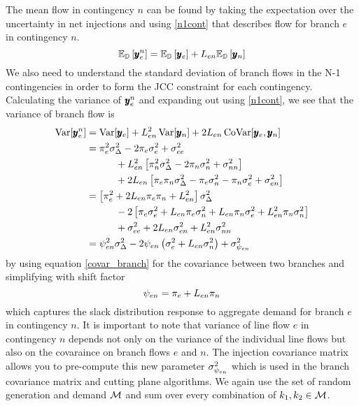 The mean flow in contingency $n$ can be found by taking the expectation over the uncertainty in net injections and using \cref{n1cont} that describes flow for branch $e$ in contingency $n$.
\begin{equation}
\mathbb{E}_{\mathbb{D}} \left[ \pmb{y}_e^n \right] =  \mathbb{E}_{\mathbb{D}} \left[ \pmb{y}_e \right]  + L_{en} \mathbb{E}_{\mathbb{D}} \left[ \pmb{y}_n \right] 
\end{equation}
We also need to understand the standard deviation of branch flows in the N-1 contingencies in order to form the JCC constraint for each contingency.  Calculating the variance of $\pmb{y}_e^n$ and expanding out using \cref{n1cont}, we see that the variance of branch flow is
\begin{subequations}
\begin{align}
 \operatorname{Var}[\pmb{y}_e^n] &= \operatorname{Var}[\pmb{y}_e] + L^2_{e n} \operatorname{Var}[ \pmb{y}_n ] + 2 L_{e n} \operatorname{CoVar}[ \pmb{y}_e, \pmb{y}_n ] \\
 &= \pi_e^2 \sigma_\Delta^2 - 2 \pi_e \sigma_e^2 + \sigma_{ee}^2 \nonumber \\
 &\hspace{30pt} + L_{en}^2 \left[ \pi_n^2 \sigma_\Delta^2 - 2 \pi_n \sigma_n^2 + \sigma_{nn}^2 \right] \nonumber \\
 &\hspace{30pt}+ 2 L_{en} \left[ \pi_{e} \pi_{n} \sigma_\Delta^2 -  \pi_{e} \sigma_{n}^2 - \pi_{n} \sigma_{e}^2   + \sigma_{e n}^2 \right]  \\
 &= \left[ \pi_e^2 + 2 L_{en} \pi_e \pi_n + L_{en}^2 \right] \sigma_\Delta^2 \nonumber\\
 &\hspace{30pt} - 2 \left[ \pi_e \sigma_e^2 + L_{en} \pi_e \sigma_n^2 + L_{en} \pi_n \sigma_e^2 + L_{en}^2 \pi_n \sigma_n^2 \right]  \nonumber \\
&\hspace{30pt} +  \sigma_{ee}^2 + 2 L_{en} \sigma_{en}^2 + L_{en}^2 \sigma_{nn}^2 \\
 &=\psi_{en}^2 \sigma_\Delta^2 - 2 \psi_{en} \left( \sigma_e^2 + L_{en} \sigma_n^2 \right) + \sigma^2_{\psi_{en}}
\end{align}
\end{subequations}
by using equation \ref{covar_branch} for the covariance between two branches and simplifying with shift factor
\begin{equation}
\psi_{en} = \pi_e + L_{en} \pi_n
\end{equation}
 which captures the slack distribution response to aggregate demand for branch $e$ in contingency $n$.  It is important to note that variance of line flow $e$ in contingency $n$ depends not only on the variance of the individual line flows but also on the covaraince on branch flows $e$ and $n$.  The injection covariance matrix allows you to pre-compute this new parameter $\sigma^2_{\psi_{en}}$ which is used in the branch covariance matrix and cutting plane algorithms.  We again use the set of random generation and demand $\mathcal{M}$ and sum over every combination of $k_1,k_2 \in \mathcal{M}$.
